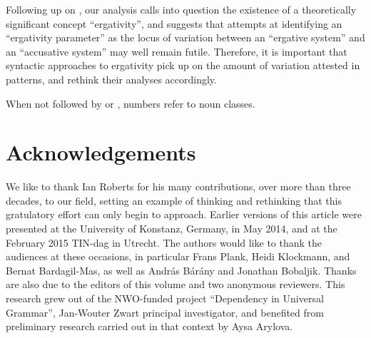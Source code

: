 \documentclass[output=paper]{langsci/langscibook}
\begin{document}
Following up on \citet{DeLancey2004}, our analysis calls into question the
existence of a theoretically significant concept \enquote{ergativity}, and
suggests that attempts at identifying an \enquote{ergativity parameter} as the
locus of variation between an \enquote{ergative system} and an
\enquote{accusative system} may well remain futile. Therefore, it is important
that syntactic approaches to ergativity pick up on the amount of variation
attested in  patterns, and rethink their analyses accordingly.

\printchapterglossary{}

\noindent When not followed by \Sg{} or \Pl{}, numbers refer to noun classes.

\section*{Acknowledgements}

We like to thank Ian Roberts for his many contributions, over more than three
decades, to our field, setting an example of thinking and rethinking that this
gratulatory effort can only begin to approach. Earlier versions of this article
were presented at the University of Konstanz, Germany, in May 2014, and at the
February 2015 TIN-dag in Utrecht. The authors would like to thank the audiences
at these occasions, in particular Frans Plank, Heidi Klockmann, and Bernat
Bardagil-Mas, as well as András Bárány and Jonathan Bobaljik. Thanks are also
due to the editors of this volume and two anonymous reviewers. This research
grew out of the NWO-funded project \enquote{Dependency in Universal Grammar},
Jan-Wouter Zwart principal investigator, and benefited from preliminary
research carried out in that context by Aysa Arylova.

{\sloppy\printbibliography[heading=subbibliography,notkeyword=this]}
\end{document}
